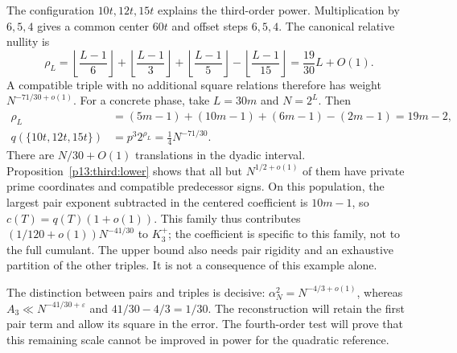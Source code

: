 The configuration $10t,12t,15t$ explains the third-order power.
Multiplication by $6,5,4$ gives a common center $60t$ and offset
steps $6,5,4$. The canonical relative nullity is
\[
 \rho_L=\left\lfloor\frac{L-1}{6}\right\rfloor+
 \left\lfloor\frac{L-1}{3}\right\rfloor+
 \left\lfloor\frac{L-1}{5}\right\rfloor-
 \left\lfloor\frac{L-1}{15}\right\rfloor
 =\frac{19}{30}L+O(1).
\]
A compatible triple with no additional square relations therefore has
weight $N^{-71/30+o(1)}$. For a concrete phase, take $L=30m$ and $N=2^L$.
Then
\[
 \begin{aligned}
 \rho_L&=(5m-1)+(10m-1)+(6m-1)-(2m-1)=19m-2,\\
 q(\{10t,12t,15t\})&=p^3 2^{\rho_L}=\frac14N^{-71/30}.
 \end{aligned}
\]
There are $N/30+O(1)$ translations in the dyadic interval.
Proposition~\ref{p13:third:lower} shows that all but $N^{1/2+o(1)}$
of them have private prime coordinates and compatible predecessor
signs. On this population, the largest pair exponent subtracted in
the centered coefficient is $10m-1$, so $c(T)=q(T)(1+o(1))$.
This family thus contributes $(1/120+o(1))N^{-41/30}$ to $K_3^+$;
the coefficient is specific to this family, not to the full cumulant.
The upper bound also needs pair rigidity and an exhaustive partition
of the other triples. It is not a consequence of this example alone.

The distinction between pairs and triples is decisive:
$\alpha_N^2=N^{-4/3+o(1)}$, whereas
$A_3\ll N^{-41/30+\varepsilon}$ and $41/30-4/3=1/30$.
The reconstruction will retain the first pair term and allow its
square in the error. The fourth-order test will prove that this
remaining scale cannot be improved in power for the quadratic reference.
